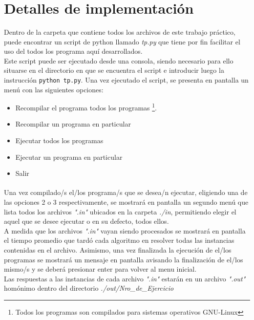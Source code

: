 \section{Detalles de implementación}
\paragraph{}
Dentro de la carpeta que contiene todos los archivos de este trabajo práctico, puede encontrar un script de python llamado \textit{tp.py} que tiene por fin facilitar el uso del todos los programa aquí desarrollados. \\
Este script puede ser ejecutado desde una consola, siendo necesario para ello situarse en el directorio en que se encuentra el script e introducir luego la instrucción \texttt{python tp.py}. Una vez ejecutado el script, se presenta en pantalla un menú con las siguientes opciones:
\begin{itemize}
	\item[1] Recompilar el programa todos los programas \footnote{Todos los programas son compilados para sistemas operativos GNU-Linux}.
	\item[2] Recompilar un programa en particular
	\item[3] Ejecutar todos los programas
	\item[4] Ejecutar un programa en particular
	\item[5] Salir
\end{itemize}

\paragraph{}
Una vez compilado/s el/los programa/s que se desea/n ejecutar, eligiendo una de las opciones 2 o 3 respectivamente, se mostrará en pantalla un segundo menú que lista todos los archivos \textit{".in"} ubicados en la carpeta \textit{./in}, permitiendo elegir el aquel que se desee ejecutar o en su defecto, todos ellos. \\
A medida que los archivos \textit{".in"} vayan siendo procesados se mostrará en pantalla el tiempo promedio que tardó cada algoritmo en resolver todas las instancias contenidas en el archivo. Asimismo, una vez finalizada la ejecución de el/los programas
se mostrará un mensaje en pantalla avisando la finalización de el/los mismo/s y se deberá presionar enter para volver al menu inicial. \\
Las respuestas a las instancias de cada archivo \textit{".in"} estarán en un archivo \textit{".out"} homónimo dentro del directorio \textit{./out/Nro\_de\_Ejercicio}

